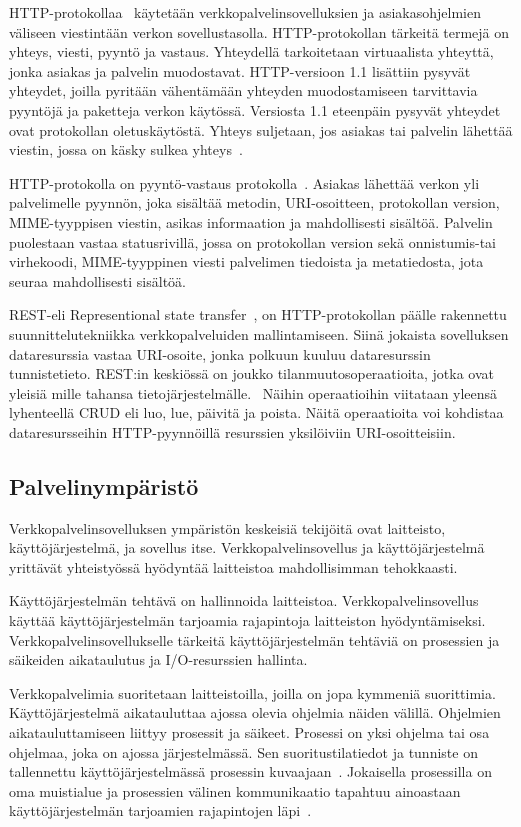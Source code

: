 \documentclass[finnish]{tktltiki2}
\theoremstyle{definition}
\theoremstyle{remark}
\begin{document}
HTTP-protokollaa~\cite{leach_hypertext} käytetään verkkopalvelinsovelluksien ja
asiakasohjelmien väliseen viestintään verkon sovellustasolla.
HTTP-protokollan tärkeitä termejä on yhteys, viesti, pyyntö ja vastaus.
Yhteydellä tarkoitetaan virtuaalista yhteyttä, jonka asiakas ja palvelin muodostavat.
HTTP-versioon 1.1 lisättiin pysyvät yhteydet, joilla pyritään
vähentämään yhteyden muodostamiseen tarvittavia pyyntöjä ja paketteja verkon
käytössä. Versiosta 1.1 eteenpäin pysyvät yhteydet ovat protokollan
oletuskäytöstä. Yhteys suljetaan, jos asiakas tai palvelin lähettää
viestin, jossa on käsky sulkea yhteys~\cite{leach_hypertext}.

HTTP-protokolla on pyyntö-vastaus protokolla~\cite{leach_hypertext}. Asiakas lähettää
verkon yli palvelimelle pyynnön, joka sisältää metodin, URI-osoitteen, protokollan
version, MIME-tyyppisen viestin, asikas informaation ja mahdollisesti
sisältöä. Palvelin puolestaan vastaa statusrivillä, jossa on protokollan
version sekä onnistumis-tai virhekoodi, MIME-tyyppinen viesti palvelimen
tiedoista ja metatiedosta, jota seuraa mahdollisesti sisältöä.


REST-eli Representional state transfer~\cite{battle_bridging_2008}, on HTTP-protokollan
päälle rakennettu suunnittelutekniikka verkkopalveluiden mallintamiseen.
Siinä jokaista sovelluksen dataresurssia vastaa URI-osoite,
jonka polkuun kuuluu dataresurssin tunnistetieto.
REST:in keskiössä on joukko tilanmuutosoperaatioita,
jotka ovat yleisiä mille tahansa tietojärjestelmälle. 
Näihin operaatioihin viitataan yleensä lyhenteellä CRUD eli 
luo, lue, päivitä ja poista.
Näitä operaatioita voi kohdistaa dataresursseihin
HTTP-pyynnöillä resurssien yksilöiviin URI-osoitteisiin.

\subsection{Palvelinympäristö}
Verkkopalvelinsovelluksen ympäristön keskeisiä
tekijöitä ovat laitteisto, käyttöjärjestelmä, ja sovellus itse.
Verkkopalvelinsovellus ja käyttöjärjestelmä
yrittävät yhteistyössä hyödyntää laitteistoa
mahdollisimman tehokkaasti.

Käyttöjärjestelmän tehtävä on hallinnoida laitteistoa.
Verkkopalvelinsovellus käyttää käyttöjärjestelmän
tarjoamia rajapintoja laitteiston hyödyntämiseksi.
Verkkopalvelinsovellukselle tärkeitä
käyttöjärjestelmän tehtäviä on 
prosessien ja säikeiden aikataulutus ja I/O-resurssien hallinta.

Verkkopalvelimia suoritetaan laitteistoilla, joilla
on jopa kymmeniä suorittimia. Käyttöjärjestelmä
aikatauluttaa ajossa olevia ohjelmia näiden välillä.
Ohjelmien aikatauluttamiseen liittyy prosessit ja säikeet.
Prosessi on yksi ohjelma tai osa ohjelmaa, joka on ajossa järjestelmässä.
Sen suoritustilatiedot ja tunniste on
tallennettu käyttöjärjestelmässä prosessin kuvaajaan~\cite{stallings_operating_2018}.
Jokaisella
prosessilla on oma muistialue ja prosessien välinen kommunikaatio
tapahtuu ainoastaan käyttöjärjestelmän tarjoamien
rajapintojen läpi~\cite{stallings_operating_2018}.
\end{document}
